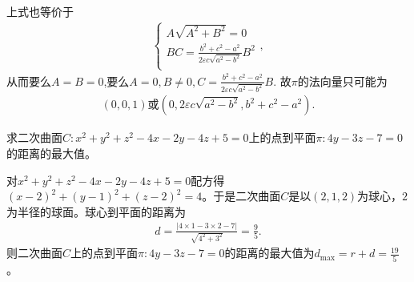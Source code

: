 \documentclass[../../main.tex]{subfiles}%
\begin{document}
\begin{solution}
\begin{align*}
\end{align*}
上式也等价于
\begin{align*}
\begin{cases}
A\sqrt{A^2+B^2}=0\\
BC=\frac{b^2+c^2-a^2}{2\varepsilon c\sqrt{a^2-b^2}}B^2\\
\end{cases},
\end{align*}
从而要么$A=B=0$,要么$A=0,B\ne 0,C=\frac{b^2+c^2-a^2}{2\varepsilon c\sqrt{a^2-b^2}}B.$
故$\pi$的法向量只可能为
\begin{align*}
(0,0,1)\text{或}(0,2\varepsilon c\sqrt{a^2-b^2},b^2+c^2-a^2).
\end{align*}

\end{solution}

\begin{example}
求二次曲面$C: x^2+y^2+z^2-4x-2y-4z+5=0$上的点到平面$\pi:4y-3z-7=0$的距离的最大值。
\end{example}
\begin{solution}
对$x^2+y^2+z^2-4x-2y-4z+5=0$配方得$(x-2)^2+(y-1)^2+(z-2)^2=4$。于是二次曲面$C$是以$(2,1,2)$为球心，$2$为半径的球面。球心到平面的距离为
\begin{align*}
d=\frac{|4\times 1-3\times 2-7|}{\sqrt{4^2+3^2}}=\frac{9}{5}.
\end{align*}
则二次曲面$C$上的点到平面$\pi:4y-3z-7=0$的距离的最大值为$d_{\mathrm{max}}=r+d=\frac{19}{5}$。
\end{solution}
\end{document}

